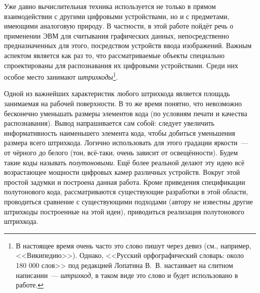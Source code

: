 Уже давно вычислительная техника используется не только в прямом 
взаимодействии с другими цифровыми устройствами, но и с предметами,
имеющими аналоговую природу. В частности, в этой работе пойдёт речь о
применении ЭВМ для считывания графических данных, 
непосредственно предназначенных 
для этого, посредством устройств ввода изображений. Важным аспектом
является как раз то, что рассматриваемые объекты специально спроектированы
для распознавания их цифровыми устройствами. Среди них особое место 
занимают \textit{штрихкоды}\footnote{В настоящее время очень часто
это слово пишут через девиз (см., например, <<Википедию>>). Однако,
<<Русский орфографический словарь: около 180 000 слов>> под редакцией
Лопатина В.~В. \cite{bib:russkijLopatin} настаивает на слитном написании~--- 
\textit{штрихкод}, в таком виде это слово и будет использовано в работе.}. 

Одной из важнейших характеристик любого штрихкода является площадь
занимаемая на рабочей поверхности. В то же время понятно, что невозможно
бесконечно уменьшать размеры элементов кода (по условиям печати и 
качества распознавания). Вывод напрашивается сам собой: следует
увеличить информативность наименьшего элемента кода, чтобы добиться
уменьшения размера всего штрихкода. Логично использовать для этого
градации яркости~--- от чёрного до белого (тон, всё-таки, очень зависит
от освещённости). Будем такие коды называть \textit{полутоновыми}. 
Ещё более реальной делают эту идею всё возрастающее
мощности цифровых камер различных устройств. Вокруг этой простой 
задумки и построена данная работа. Кроме приведения спецификации 
полутонового кода, рассматриваются существующие разработки в этой 
области, проводиться сравнение с существующими подходами (автору не 
известны другие штрихкоды построенные на этой идеи), приводиться
реализация полутонового штрихкода. 


